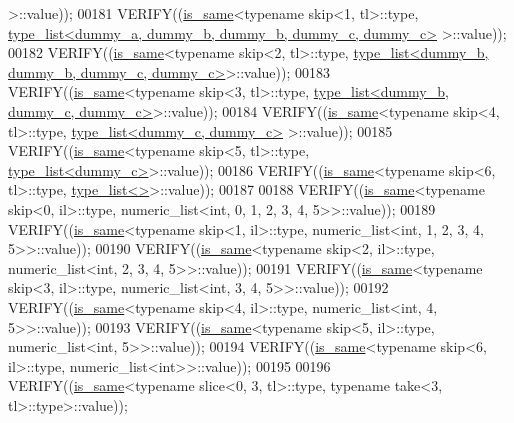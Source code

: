 \begin{DoxyCode}
      >::value));
00181   VERIFY((\hyperlink{struct_eigen_1_1internal_1_1is__same}{is\_same}<\textcolor{keyword}{typename} skip<1, tl>::type, 
      \hyperlink{struct_eigen_1_1internal_1_1type__list}{type\_list<dummy\_a, dummy\_b, dummy\_b, dummy\_c, dummy\_c>}
      >::value));
00182   VERIFY((\hyperlink{struct_eigen_1_1internal_1_1is__same}{is\_same}<\textcolor{keyword}{typename} skip<2, tl>::type, 
      \hyperlink{struct_eigen_1_1internal_1_1type__list}{type\_list<dummy\_b, dummy\_b, dummy\_c, dummy\_c>}>::value));
00183   VERIFY((\hyperlink{struct_eigen_1_1internal_1_1is__same}{is\_same}<\textcolor{keyword}{typename} skip<3, tl>::type, 
      \hyperlink{struct_eigen_1_1internal_1_1type__list}{type\_list<dummy\_b, dummy\_c, dummy\_c>}>::value));
00184   VERIFY((\hyperlink{struct_eigen_1_1internal_1_1is__same}{is\_same}<\textcolor{keyword}{typename} skip<4, tl>::type, \hyperlink{struct_eigen_1_1internal_1_1type__list}{type\_list<dummy\_c, dummy\_c>}
      >::value));
00185   VERIFY((\hyperlink{struct_eigen_1_1internal_1_1is__same}{is\_same}<\textcolor{keyword}{typename} skip<5, tl>::type, \hyperlink{struct_eigen_1_1internal_1_1type__list}{type\_list<dummy\_c>}>::value));
00186   VERIFY((\hyperlink{struct_eigen_1_1internal_1_1is__same}{is\_same}<\textcolor{keyword}{typename} skip<6, tl>::type, \hyperlink{struct_eigen_1_1internal_1_1type__list}{type\_list<>}>::value));
00187 
00188   VERIFY((\hyperlink{struct_eigen_1_1internal_1_1is__same}{is\_same}<\textcolor{keyword}{typename} skip<0, il>::type, numeric\_list<int, 0, 1, 2, 3, 4, 5>>::value));
00189   VERIFY((\hyperlink{struct_eigen_1_1internal_1_1is__same}{is\_same}<\textcolor{keyword}{typename} skip<1, il>::type, numeric\_list<int, 1, 2, 3, 4, 5>>::value));
00190   VERIFY((\hyperlink{struct_eigen_1_1internal_1_1is__same}{is\_same}<\textcolor{keyword}{typename} skip<2, il>::type, numeric\_list<int, 2, 3, 4, 5>>::value));
00191   VERIFY((\hyperlink{struct_eigen_1_1internal_1_1is__same}{is\_same}<\textcolor{keyword}{typename} skip<3, il>::type, numeric\_list<int, 3, 4, 5>>::value));
00192   VERIFY((\hyperlink{struct_eigen_1_1internal_1_1is__same}{is\_same}<\textcolor{keyword}{typename} skip<4, il>::type, numeric\_list<int, 4, 5>>::value));
00193   VERIFY((\hyperlink{struct_eigen_1_1internal_1_1is__same}{is\_same}<\textcolor{keyword}{typename} skip<5, il>::type, numeric\_list<int, 5>>::value));
00194   VERIFY((\hyperlink{struct_eigen_1_1internal_1_1is__same}{is\_same}<\textcolor{keyword}{typename} skip<6, il>::type, numeric\_list<int>>::value));
00195 
00196   VERIFY((\hyperlink{struct_eigen_1_1internal_1_1is__same}{is\_same}<\textcolor{keyword}{typename} slice<0, 3, tl>::type, \textcolor{keyword}{typename} take<3, tl>::type>::value));

\end{DoxyCode}
